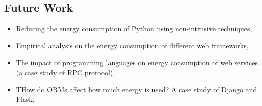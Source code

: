 \subsection*{Future Work}
\begin{itemize}
    \item Reducing the energy consumption of Python using non-intrusive techniques,
    \item Empirical analysis on the energy consumption of different web frameworks,
    \item The impact of programming languages on energy consumption of web services (a case study of RPC protocol),
    \item THow do ORMs affect how much energy is used? A case study of Django and Flask.
\end{itemize}

\cleardoublepage
